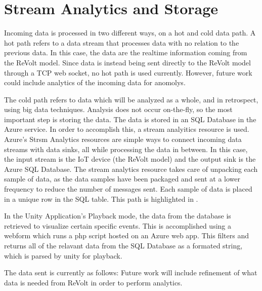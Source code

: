 \section{Stream Analytics and Storage}
Incoming data is processed in two different ways, on a hot and cold data path. A hot path refers to a data stream that processes data with no relation to the previous data. In this case, the data are the realtime information coming from the ReVolt model. Since data is instead being sent directly to the ReVolt model through a TCP web socket, no hot path is used currently. However, future work could include analytics of the incoming data for anomolys.

The cold path refers to data which will be analyzed as a whole, and in retrospect, using big data techniques. Analysis does not occur on-the-fly, so the most important step is storing the data. The data is stored in an SQL Database in the Azure service. In order to accomplish this, a stream analyitics resource is used. Azure's Strsm Analytics resources are simple ways to connect incoming data streams with data sinks, all while processing the data in between. In this case, the input stream is the IoT device (the ReVolt model) and the output sink is the Azure SQL Database. The stream analytics resource takes care of unpacking each sample of data, as the data samples have been packaged and sent at a lower frequency to reduce the number of messages sent. Each sample of data is placed in a unique row in the SQL table. This path is highlighted in . 

In the Unity Application's Playback mode, the data from the database is retrieved to visualize certain specific events. This is accomplished using a webform which runs a php script hosted on an Azure web app. This filters and returns all of the relavant data from the SQL Database as a formated string, which is parsed by unity for playback.

The data sent is currently as follows:
Future work will include refinement of what data is needed from ReVolt in order to perform analytics.





